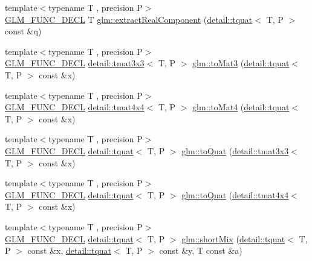 \begin{DoxyCompactItemize}
{\footnotesize template$<$typename T , precision P$>$ }\\\hyperlink{setup_8hpp_ab2d052de21a70539923e9bcbf6e83a51}{G\+L\+M\+\_\+\+F\+U\+N\+C\+\_\+\+D\+E\+CL} T \hyperlink{group__gtx__quaternion_gaad86e595f0021253cb9d34ca32f27f3c}{glm\+::extract\+Real\+Component} (\hyperlink{structglm_1_1detail_1_1tquat}{detail\+::tquat}$<$ T, P $>$ const \&q)
\item 
{\footnotesize template$<$typename T , precision P$>$ }\\\hyperlink{setup_8hpp_ab2d052de21a70539923e9bcbf6e83a51}{G\+L\+M\+\_\+\+F\+U\+N\+C\+\_\+\+D\+E\+CL} \hyperlink{structglm_1_1detail_1_1tmat3x3}{detail\+::tmat3x3}$<$ T, P $>$ \hyperlink{group__gtx__quaternion_ga9955d74e4bdcfec4039c5285c6e99d8f}{glm\+::to\+Mat3} (\hyperlink{structglm_1_1detail_1_1tquat}{detail\+::tquat}$<$ T, P $>$ const \&x)
\item 
{\footnotesize template$<$typename T , precision P$>$ }\\\hyperlink{setup_8hpp_ab2d052de21a70539923e9bcbf6e83a51}{G\+L\+M\+\_\+\+F\+U\+N\+C\+\_\+\+D\+E\+CL} \hyperlink{structglm_1_1detail_1_1tmat4x4}{detail\+::tmat4x4}$<$ T, P $>$ \hyperlink{group__gtx__quaternion_ga5d441af6e45262436e73070269d8470c}{glm\+::to\+Mat4} (\hyperlink{structglm_1_1detail_1_1tquat}{detail\+::tquat}$<$ T, P $>$ const \&x)
\item 
{\footnotesize template$<$typename T , precision P$>$ }\\\hyperlink{setup_8hpp_ab2d052de21a70539923e9bcbf6e83a51}{G\+L\+M\+\_\+\+F\+U\+N\+C\+\_\+\+D\+E\+CL} \hyperlink{structglm_1_1detail_1_1tquat}{detail\+::tquat}$<$ T, P $>$ \hyperlink{group__gtx__quaternion_ga7647cfc0f26055a4eea4f99a35964d7b}{glm\+::to\+Quat} (\hyperlink{structglm_1_1detail_1_1tmat3x3}{detail\+::tmat3x3}$<$ T, P $>$ const \&x)
\item 
{\footnotesize template$<$typename T , precision P$>$ }\\\hyperlink{setup_8hpp_ab2d052de21a70539923e9bcbf6e83a51}{G\+L\+M\+\_\+\+F\+U\+N\+C\+\_\+\+D\+E\+CL} \hyperlink{structglm_1_1detail_1_1tquat}{detail\+::tquat}$<$ T, P $>$ \hyperlink{group__gtx__quaternion_gab2e47ea15791ee85dfacfd9e952bad64}{glm\+::to\+Quat} (\hyperlink{structglm_1_1detail_1_1tmat4x4}{detail\+::tmat4x4}$<$ T, P $>$ const \&x)
\item 
{\footnotesize template$<$typename T , precision P$>$ }\\\hyperlink{setup_8hpp_ab2d052de21a70539923e9bcbf6e83a51}{G\+L\+M\+\_\+\+F\+U\+N\+C\+\_\+\+D\+E\+CL} \hyperlink{structglm_1_1detail_1_1tquat}{detail\+::tquat}$<$ T, P $>$ \hyperlink{group__gtx__quaternion_ga297f92682708e59bda1849ca3aad0fea}{glm\+::short\+Mix} (\hyperlink{structglm_1_1detail_1_1tquat}{detail\+::tquat}$<$ T, P $>$ const \&x, \hyperlink{structglm_1_1detail_1_1tquat}{detail\+::tquat}$<$ T, P $>$ const \&y, T const \&a)

\end{DoxyCompactItemize}
